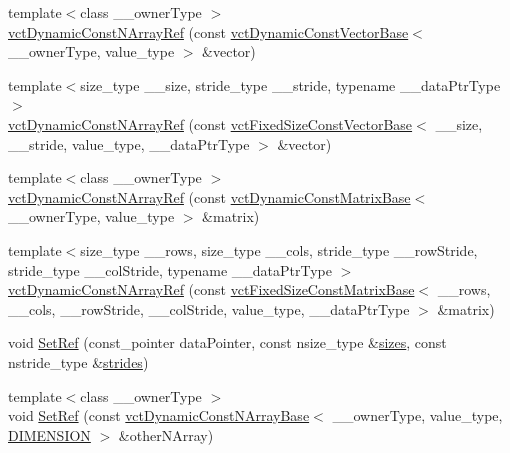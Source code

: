 \begin{DoxyCompactItemize}
\item 
{\footnotesize template$<$class \-\_\-\-\_\-owner\-Type $>$ }\\\hyperlink{classvct_dynamic_const_n_array_ref_a027bb3c565f2e28905b5758ebd806bfd}{vct\-Dynamic\-Const\-N\-Array\-Ref} (const \hyperlink{classvct_dynamic_const_vector_base}{vct\-Dynamic\-Const\-Vector\-Base}$<$ \-\_\-\-\_\-owner\-Type, value\-\_\-type $>$ \&vector)
\item 
{\footnotesize template$<$size\-\_\-type \-\_\-\-\_\-size, stride\-\_\-type \-\_\-\-\_\-stride, typename \-\_\-\-\_\-data\-Ptr\-Type $>$ }\\\hyperlink{classvct_dynamic_const_n_array_ref_a0c766c28385dbe64ee4bcd292d35a2ac}{vct\-Dynamic\-Const\-N\-Array\-Ref} (const \hyperlink{classvct_fixed_size_const_vector_base}{vct\-Fixed\-Size\-Const\-Vector\-Base}$<$ \-\_\-\-\_\-size, \-\_\-\-\_\-stride, value\-\_\-type, \-\_\-\-\_\-data\-Ptr\-Type $>$ \&vector)
\item 
{\footnotesize template$<$class \-\_\-\-\_\-owner\-Type $>$ }\\\hyperlink{classvct_dynamic_const_n_array_ref_a5b0a8d09e3f3b9fc3504bb24a91c9903}{vct\-Dynamic\-Const\-N\-Array\-Ref} (const \hyperlink{classvct_dynamic_const_matrix_base}{vct\-Dynamic\-Const\-Matrix\-Base}$<$ \-\_\-\-\_\-owner\-Type, value\-\_\-type $>$ \&matrix)
\item 
{\footnotesize template$<$size\-\_\-type \-\_\-\-\_\-rows, size\-\_\-type \-\_\-\-\_\-cols, stride\-\_\-type \-\_\-\-\_\-row\-Stride, stride\-\_\-type \-\_\-\-\_\-col\-Stride, typename \-\_\-\-\_\-data\-Ptr\-Type $>$ }\\\hyperlink{classvct_dynamic_const_n_array_ref_a1f6ad56c805dcbabf339a832a4ce03ad}{vct\-Dynamic\-Const\-N\-Array\-Ref} (const \hyperlink{classvct_fixed_size_const_matrix_base}{vct\-Fixed\-Size\-Const\-Matrix\-Base}$<$ \-\_\-\-\_\-rows, \-\_\-\-\_\-cols, \-\_\-\-\_\-row\-Stride, \-\_\-\-\_\-col\-Stride, value\-\_\-type, \-\_\-\-\_\-data\-Ptr\-Type $>$ \&matrix)
\item 
void \hyperlink{classvct_dynamic_const_n_array_ref_a884884393e32fd34236be9c1a60c5ad2}{Set\-Ref} (const\-\_\-pointer data\-Pointer, const nsize\-\_\-type \&\hyperlink{classvct_dynamic_const_n_array_base_aa86793343d80325ba5671bc24a2e0e8f}{sizes}, const nstride\-\_\-type \&\hyperlink{classvct_dynamic_const_n_array_base_a6608baee60a448ccb9598417c487cde2}{strides})
\item 
{\footnotesize template$<$class \-\_\-\-\_\-owner\-Type $>$ }\\void \hyperlink{classvct_dynamic_const_n_array_ref_a65a8a12c6c64b63ead1653c9cf8b2e16}{Set\-Ref} (const \hyperlink{classvct_dynamic_const_n_array_base}{vct\-Dynamic\-Const\-N\-Array\-Base}$<$ \-\_\-\-\_\-owner\-Type, value\-\_\-type, \hyperlink{classvct_dynamic_const_n_array_ref_ae8d52484153d181fd3ac08be58589848ae003ed9f88ed51f50c6c180506995b93}{D\-I\-M\-E\-N\-S\-I\-O\-N} $>$ \&other\-N\-Array)

\end{DoxyCompactItemize}
